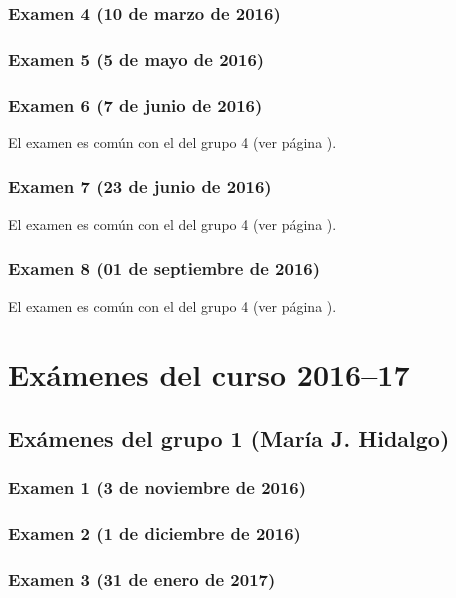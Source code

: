 \documentclass[a4paper,12pt,twoside]{book}
\begin{document}
\subsection{Examen 4 (10 de marzo de 2016)}
\subsection{Examen 5 (5 de mayo de 2016)}
\subsection{Examen 6 (7 de junio de 2016)} 
El examen es común con el del grupo 4 (ver página \pageref{examen_15_16_4_6}).
\subsection{Examen 7 (23 de junio de 2016)}
El examen es común con el del grupo 4 (ver página \pageref{examen_15_16_4_7}).
\subsection{Examen 8 (01 de septiembre de 2016)}
El examen es común con el del grupo 4 (ver página \pageref{examen_15_16_4_8}).

\chapter{Exámenes del curso 2016--17}

\section{Exámenes del grupo 1 (María J. Hidalgo)}
\subsection{Examen 1 (3 de noviembre de 2016)}
\subsection{Examen 2 (1 de diciembre de 2016)}
\subsection{Examen 3 (31 de enero de 2017)}
 \label{examen_16_17_1_3}
\end{document}
